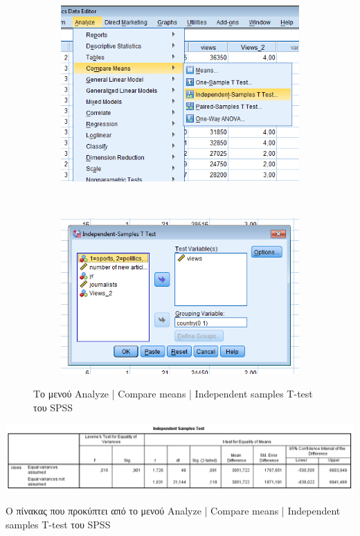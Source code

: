 \documentclass{assignment}
\begin{document}
\begin{Assignment}[Μέρος Β]
\begin{figure}[htbp]
  \centering
  \begin{subfigure}[b]{0.5\textwidth}
     \includegraphics[width=\textwidth,height=0.25\textheight]{images/menu_independent_Samples_T_Test.png}
  \end{subfigure}%
   ~ %
  \begin{subfigure}[b]{0.5\textwidth}
    \includegraphics[width=\textwidth,height=0.25\textheight]{images/independent_Samples_T_Test.png}
  \end{subfigure}
  \caption{Το μενού Analyze | Compare means | Independent samples T-test του SPSS}
\label{fig:sample_T_Test}
\end{figure}

\begin{table}[htbp]
\includegraphics[width=\textwidth]{images/table_independent_Sample_T_Test.png}
\caption{Ο πίνακας που προκύπτει από το μενού Analyze | Compare means | Independent samples T-test του SPSS}
\label{table:sample_T_Test}
\end{table}


\end{Assignment}
\end{document}
